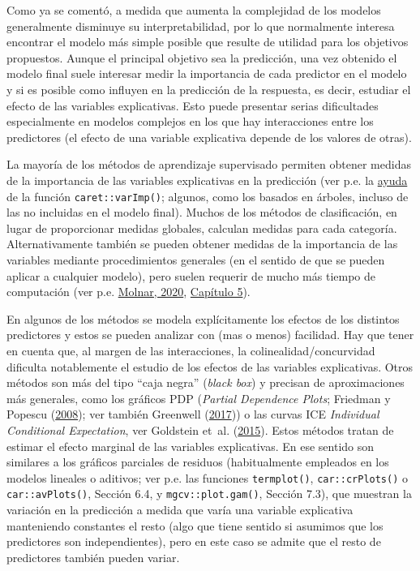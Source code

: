 \documentclass[
  spanish,
]{book}
\theoremstyle{break}
\theoremstyle{definition}
\theoremstyle{definition}
\theoremstyle{definition}
\theoremstyle{remark}
\begin{document}
Como ya se comentó, a medida que aumenta la complejidad de los modelos generalmente disminuye su interpretabilidad, por lo que normalmente interesa encontrar el modelo más simple posible que resulte de utilidad para los objetivos propuestos.
Aunque el principal objetivo sea la predicción, una vez obtenido el modelo final suele interesar medir la importancia de cada predictor en el modelo y si es posible como influyen en la predicción de la respuesta, es decir, estudiar el efecto de las variables explicativas.
Esto puede presentar serias dificultades especialmente en modelos complejos en los que hay interacciones entre los predictores (el efecto de una variable explicativa depende de los valores de otras).

La mayoría de los métodos de aprendizaje supervisado permiten obtener medidas de la importancia de las variables explicativas en la predicción (ver p.e. la \href{https://topepo.github.io/caret/variable-importance.html}{ayuda} de la función \texttt{caret::varImp()}; algunos, como los basados en árboles, incluso de las no incluidas en el modelo final).
Muchos de los métodos de clasificación, en lugar de proporcionar medidas globales, calculan medidas para cada categoría.
Alternativamente también se pueden obtener medidas de la importancia de las variables mediante procedimientos generales (en el sentido de que se pueden aplicar a cualquier modelo), pero suelen requerir de mucho más tiempo de computación (ver p.e. \href{https://christophm.github.io/interpretable-ml-book}{Molnar, 2020}, \href{https://christophm.github.io/interpretable-ml-book/agnostic.htm}{Capítulo 5}).

En algunos de los métodos se modela explícitamente los efectos de los distintos predictores y estos se pueden analizar con (mas o menos) facilidad.
Hay que tener en cuenta que, al margen de las interacciones, la colinealidad/concurvidad dificulta notablemente el estudio de los efectos de las variables explicativas.
Otros métodos son más del tipo ``caja negra'' (\emph{black box}) y precisan de aproximaciones más generales, como los gráficos PDP (\emph{Partial Dependence Plots}; Friedman y Popescu (\protect\hyperlink{ref-friedman2008predictive}{2008}); ver también Greenwell (\protect\hyperlink{ref-greenwell2020dblp}{2017})) o las curvas ICE \emph{Individual Conditional Expectation}, ver Goldstein et~al. (\protect\hyperlink{ref-goldstein2015peeking}{2015}).
Estos métodos tratan de estimar el efecto marginal de las variables explicativas.
En ese sentido son similares a los gráficos parciales de residuos (habitualmente empleados en los modelos lineales o aditivos; ver p.e. las funciones \texttt{termplot()}, \texttt{car::crPlots()} o \texttt{car::avPlots()}, Sección 6.4, y \texttt{mgcv::plot.gam()}, Sección 7.3), que muestran la variación en la predicción a medida que varía una variable explicativa manteniendo constantes el resto (algo que tiene sentido si asumimos que los predictores son independientes), pero en este caso se admite que el resto de predictores también pueden variar.
\end{document}
